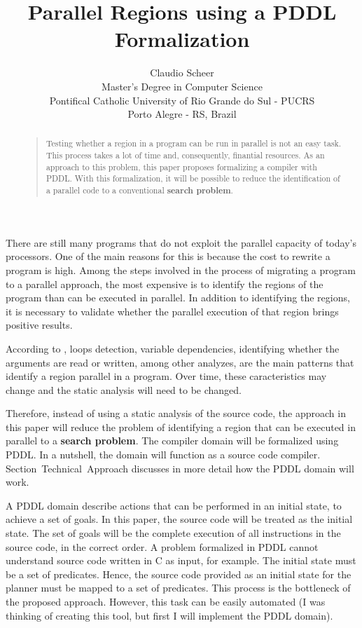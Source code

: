 \documentclass[letterpaper]{article}
\begin{document}
\title{Parallel Regions using a PDDL Formalization}
\author{Claudio Scheer\\
  Master's Degree in Computer Science\\
  Pontifical Catholic University of Rio Grande do Sul - PUCRS\\
  Porto Alegre - RS, Brazil\\
}
\maketitle

\begin{abstract}
  \begin{quote}
    Testing whether a region in a program can be run in parallel is not an easy task. This process takes a lot of time and, consequently, finantial resources. As an approach to this problem, this paper proposes formalizing a compiler with PDDL. With this formalization, it will be possible to reduce the identification of a parallel code to a conventional \textbf{search problem}.
  \end{quote}
\end{abstract}

\noindent There are still many programs that do not exploit the parallel capacity of today's processors. One of the main reasons for this is because the cost to rewrite a program is high. Among the steps involved in the process of migrating a program to a parallel approach, the most expensive is to identify the regions of the program than can be executed in parallel. In addition to identifying the regions, it is necessary to validate whether the parallel execution of that region brings positive results.

According to \cite{doi:10.1177/1094342017695639}, loops detection, variable dependencies, identifying whether the arguments are read or written, among other analyzes, are the main patterns that identify a region parallel in a program. Over time, these caracteristics may change and the static analysis will need to be changed.

Therefore, instead of using a static analysis of the source code, the approach in this paper will reduce the problem of identifying a region that can be executed in parallel to a \textbf{search problem}. The compiler domain will be formalized using PDDL. In a nutshell, the domain will function as a source code compiler. Section~Technical~Approach discusses in more detail how the PDDL domain will work.

A PDDL domain describe actions that can be performed in an initial state, to achieve a set of goals. In this paper, the source code will be treated as the initial state. The set of goals will be the complete execution of all instructions in the source code, in the correct order. A problem formalized in PDDL cannot understand source code written in C as input, for example. The initial state must be a set of predicates. Hence, the source code provided as an initial state for the planner must be mapped to a set of predicates. This process is the bottleneck of the proposed approach. However, this task can be easily automated (I was thinking of creating this tool, but first I will implement the PDDL domain).
\end{document}
